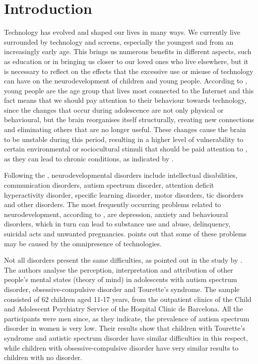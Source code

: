 \documentclass[english]{textolivre}
\begin{document}
\section{Introduction}\label{sec-intro}
Technology has evolved and shaped our lives in many ways. We currently live surrounded by technology and screens, especially the youngest and from an increasingly early age. This brings us numerous benefits in different aspects, such as education or in bringing us closer to our loved ones who live elsewhere, but it is necessary to reflect on the effects that the excessive use or misuse of technology can have on the neurodevelopment of children and young people. According to \textcite{matali2021}, young people are the age group that lives most connected to the Internet and this fact means that we should pay attention to their behaviour towards technology, since the changes that occur during adolescence are not only physical or behavioural, but the brain reorganises itself structurally, creating new connections and eliminating others that are no longer useful. These changes cause the brain to be unstable during this period, resulting in a higher level of vulnerability to certain environmental or sociocultural stimuli that should be paid attention to \cite{russi2021}, as they can lead to chronic conditions, as indicated by \textcite{galan2017abordaje}. %

Following the \textcite{american2014dsm}, %
neurodevelopmental disorders include intellectual disabilities, communication disorders, autism spectrum disorder, attention deficit hyperactivity disorder, specific learning disorder, motor disorders, tic disorders and other disorders. The most frequently occurring problems related to neurodevelopment, according to \textcite{galan2017abordaje}, %
are depression, anxiety and behavioural disorders, which in turn can lead to substance use and abuse, delinquency, suicidal acts and unwanted pregnancies. \textcite{dealvarado2019trastornos} %
points out that some of these problems may be caused by the omnipresence of technologies.

Not all disorders present the same difficulties, as pointed out in the study by 
\textcite{perez2021theory}. %
The authors analyse the perception, interpretation and attribution of other people's mental states (theory of mind) in adolescents with autism spectrum disorder, obsessive-compulsive disorder and Tourette's syndrome. The sample consisted of 62 children aged 11-17 years, from the outpatient clinics of the Child and Adolescent Psychiatry Service of the Hospital Clínic de Barcelona. All the participants were men since, as they indicate, the prevalence of autism spectrum disorder in women is very low. Their results show that children with Tourette's syndrome and autistic spectrum disorder have similar difficulties in this respect, while children with obsessive-compulsive disorder have very similar results to children with no disorder.
\end{document}
